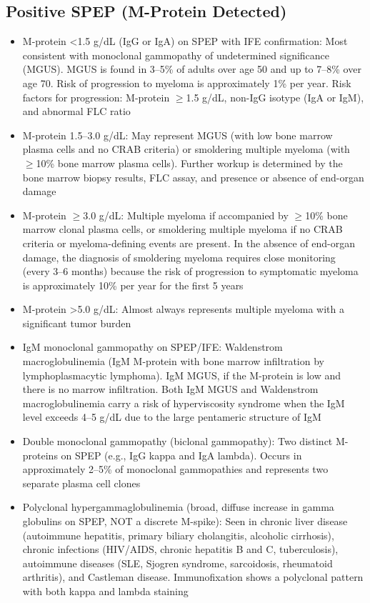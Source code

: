 \subsection*{Positive SPEP (M-Protein Detected)}
\begin{itemize}
  \item M-protein <1.5 g/dL (IgG or IgA) on SPEP with IFE confirmation: Most consistent with monoclonal gammopathy of undetermined significance (MGUS). MGUS is found in 3--5\% of adults over age 50 and up to 7--8\% over age 70. Risk of progression to myeloma is approximately 1\% per year. Risk factors for progression: M-protein $\geq$1.5 g/dL, non-IgG isotype (IgA or IgM), and abnormal FLC ratio \cite{kyle2010monoclonal}
  \item M-protein 1.5--3.0 g/dL: May represent MGUS (with low bone marrow plasma cells and no CRAB criteria) or smoldering multiple myeloma (with $\geq$10\% bone marrow plasma cells). Further workup is determined by the bone marrow biopsy results, FLC assay, and presence or absence of end-organ damage
  \item M-protein $\geq$3.0 g/dL: Multiple myeloma if accompanied by $\geq$10\% bone marrow clonal plasma cells, or smoldering multiple myeloma if no CRAB criteria or myeloma-defining events are present. In the absence of end-organ damage, the diagnosis of smoldering myeloma requires close monitoring (every 3--6 months) because the risk of progression to symptomatic myeloma is approximately 10\% per year for the first 5 years
  \item M-protein >5.0 g/dL: Almost always represents multiple myeloma with a significant tumor burden
  \item IgM monoclonal gammopathy on SPEP/IFE: Waldenstrom macroglobulinemia (IgM M-protein with bone marrow infiltration by lymphoplasmacytic lymphoma). IgM MGUS, if the M-protein is low and there is no marrow infiltration. Both IgM MGUS and Waldenstrom macroglobulinemia carry a risk of hyperviscosity syndrome when the IgM level exceeds 4--5 g/dL due to the large pentameric structure of IgM
  \item Double monoclonal gammopathy (biclonal gammopathy): Two distinct M-proteins on SPEP (e.g., IgG kappa and IgA lambda). Occurs in approximately 2--5\% of monoclonal gammopathies and represents two separate plasma cell clones
  \item Polyclonal hypergammaglobulinemia (broad, diffuse increase in gamma globulins on SPEP, NOT a discrete M-spike): Seen in chronic liver disease (autoimmune hepatitis, primary biliary cholangitis, alcoholic cirrhosis), chronic infections (HIV/AIDS, chronic hepatitis B and C, tuberculosis), autoimmune diseases (SLE, Sjogren syndrome, sarcoidosis, rheumatoid arthritis), and Castleman disease. Immunofixation shows a polyclonal pattern with both kappa and lambda staining

\end{itemize}

